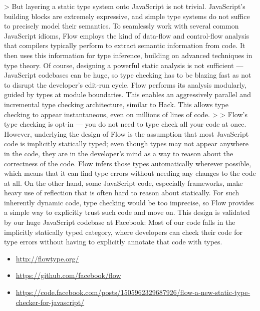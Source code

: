   > But layering a static type system onto JavaScript is not trivial. JavaScript’s building blocks are extremely expressive, and simple type systems do not suffice to precisely model their semantics. To seamlessly work with several common JavaScript idioms, Flow employs the kind of data-flow and control-flow analysis that compilers typically perform to extract semantic information from code. It then uses this information for type inference, building on advanced techniques in type theory. Of course, designing a powerful static analysis is not sufficient — JavaScript codebases can be huge, so type checking has to be blazing fast as not to disrupt the developer’s edit-run cycle. Flow performs its analysis modularly, guided by types at module boundaries. This enables an aggressively parallel and incremental type checking architecture, similar to Hack. This allows type checking to appear instantaneous, even on millions of lines of code.
  >
  > Flow’s type checking is opt-in — you do not need to type check all your code at once. However, underlying the design of Flow is the assumption that most JavaScript code is implicitly statically typed; even though types may not appear anywhere in the code, they are in the developer’s mind as a way to reason about the correctness of the code. Flow infers those types automatically wherever possible, which means that it can find type errors without needing any changes to the code at all. On the other hand, some JavaScript code, especially frameworks, make heavy use of reflection that is often hard to reason about statically. For such inherently dynamic code, type checking would be too imprecise, so Flow provides a simple way to explicitly trust such code and move on. This design is validated by our huge JavaScript codebase at Facebook: Most of our code falls in the implicitly statically typed category, where developers can check their code for type errors without having to explicitly annotate that code with types.


\begin{itemize}
  \item \url{http://flowtype.org/}
  \item \url{https://github.com/facebook/flow}
  \item \url{https://code.facebook.com/posts/1505962329687926/flow-a-new-static-type-checker-for-javascript/}
 \end{itemize}

